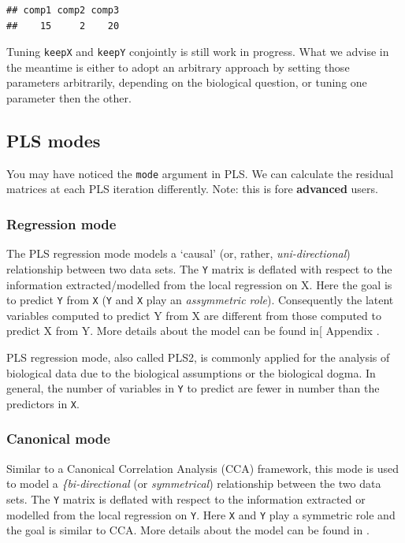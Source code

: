 \documentclass[]{book}
\theoremstyle{definition}
\theoremstyle{definition}
\theoremstyle{definition}
\theoremstyle{remark}
\begin{document}
\begin{verbatim}
## comp1 comp2 comp3 
##    15     2    20
\end{verbatim}

Tuning \texttt{keepX} and \texttt{keepY} conjointly is still work in
progress. What we advise in the meantime is either to adopt an arbitrary
approach by setting those parameters arbitrarily, depending on the
biological question, or tuning one parameter then the other.

\subsection{PLS modes}\label{PLS:details}

You may have noticed the \texttt{mode} argument in PLS. We can calculate
the residual matrices at each PLS iteration differently. Note: this is
fore \textbf{advanced} users.

\subsubsection{Regression mode}\label{regression-mode}

The PLS regression mode models a `causal' (or, rather,
\emph{uni-directional}) relationship between two data sets. The
\texttt{Y} matrix is deflated with respect to the information
extracted/modelled from the local regression on X. Here the goal is to
predict \texttt{Y} from \texttt{X} (\texttt{Y} and \texttt{X} play an
\emph{assymmetric role}). Consequently the latent variables computed to
predict Y from X are different from those computed to predict X from Y.
More details about the model can be found in{[} Appendix \citep{Lec08}.

PLS regression mode, also called PLS2, is commonly applied for the
analysis of biological data \citep{Bou05, Byl07} due to the biological
assumptions or the biological dogma. In general, the number of variables
in \texttt{Y} to predict are fewer in number than the predictors in
\texttt{X}.

\subsubsection{Canonical mode}\label{canonical-mode}

Similar to a Canonical Correlation Analysis (CCA) framework, this mode
is used to model a \emph{\{bi-directional} (or \emph{symmetrical})
relationship between the two data sets. The \texttt{Y} matrix is
deflated with respect to the information extracted or modelled from the
local regression on \texttt{Y}. Here \texttt{X} and \texttt{Y} play a
symmetric role and the goal is similar to CCA. More details about the
model can be found in \citep{Lec09a}.
\end{document}
